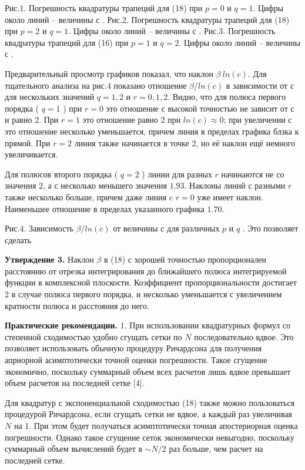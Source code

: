 Рис.1. Погрешность квадратуры трапеций для (18) при $p = 0$ и $q =1$.
Цифры около линий – величины с .
Рис.2. Погрешность квадратуры трапеций для (18) при $p = 2$ и $q =1$.
Цифры около линий – величины с .
Рис.3. Погрешность квадратуры трапеций для (16) при $p =1$ и $q = 2$.
Цифры около линий – величины с .

Предварительный просмотр графиков показал, что наклон $\beta ~ ln(c)$. Для
тщательного анализа на рис.4 показано отношение $\beta / ln(c)$ в зависимости от $с$
для нескольких значений $q =1,2$ и $r = 0,1,2$. Видно, что для полюса первого
порядка ( $q =1$ ) при $r=0$ это отношение с высокой точностью не зависит от
$с$ и равно $2$. При $r=1$ это отношение равно 2 при $ln(c) \approx 0$; при увеличении с это отношение несколько уменьшается, причем линия в пределах графика блзка к прямой. При $r=2$ линия также начинается в точке 2, но её наклон ещё немного увеличивается.

Для полюсов второго порядка ( $q = 2$ ) линии для разных $r$ начинаются не со значения $2$, а с несколько меньшего значения $1.93$. Наклоны линий с разными $r$ также несколько больше, причем даже линия c $r=0$ уже имеет наклон. Наименьшее отношение в пределах указанного графика $1.70$.

Рис.4. Зависимость $\beta / ln(c)$ от величины с для различных $p$ и $q$ .
Это позволяет сделать

\textbf{Утверждение 3.} Наклон $\beta$ в (18) с хорошей точностью пропорционален
расстоянию от отрезка интегрирования до ближайшего полюса интегрируемой
функции в комплексной плоскости. Коэффициент пропорциональности достигает 2 в случае полюса первого порядка, и несколько уменьшается с увеличением кратности полюса и расстояния до него.

\textbf{Практические рекомендации.} 1. При использовании квадратурных
формул со степенной сходимостью удобно сгущать сетки по $N$
последовательно вдвое. Это позволяет использовать обычную процедуру
Ричардсона для получения априорной асимптотически точной оценки
погрешности. Такое сгущение экономично, поскольку суммарный объем всех
расчетов лишь вдвое превышает объем расчетов на последней сетке [4].

Для квадратур с экспоненциальной сходимостью (18) также можно
пользоваться процедурой Ричардсона, если сгущать сетки не вдвое, а каждый
раз увеличивая $N$ на 1. При этом будет получаться асимптотически точная
апостериорная оценка погрешности. Однако такое сгущение сеток
экономически невыгодно, поскольку суммарный объем вычислений будет в
$\sim N / 2$ раз больше, чем расчет на последней сетке.

